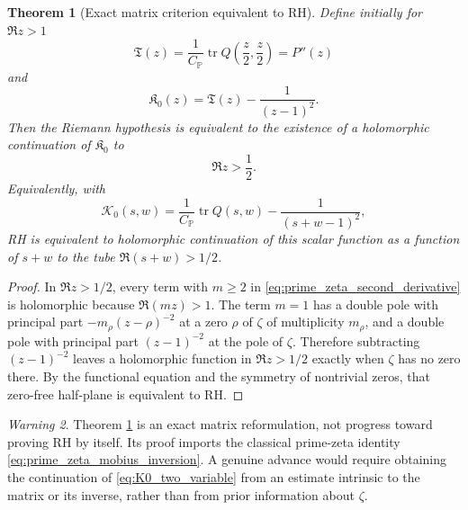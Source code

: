 \documentclass[11pt]{amsart}
\numberwithin{equation}{section}
\theoremstyle{plain}
\newtheorem{theorem}{Theorem}[section]
\theoremstyle{definition}
\theoremstyle{remark}
\newtheorem{warning}[theorem]{Warning}
\newcommand{\tr}{\operatorname{tr}}
\begin{document}
\begin{theorem}[Exact matrix criterion equivalent to RH]
\label{thm:matrix_RH_criterion}
Define initially for $\Re z>1$
\begin{equation}
\mathfrak T(z)=
\frac{1}{C_{\mathbb P}}
\tr Q\left(\frac z2,\frac z2\right)=P''(z)
\label{eq:T_prime_zeta}
\end{equation}
and
\begin{equation}
\mathfrak K_0(z)=\mathfrak T(z)-\frac{1}{(z-1)^2}.
\label{eq:K0_one_variable}
\end{equation}
Then the Riemann hypothesis is equivalent to the existence of a holomorphic continuation of $\mathfrak K_0$ to
\begin{equation}
\Re z>\frac12.
\label{eq:K0_target_half_plane}
\end{equation}
Equivalently, with
\begin{equation}
\mathcal K_0(s,w)=
\frac{1}{C_{\mathbb P}}\tr Q(s,w)
-\frac{1}{(s+w-1)^2},
\label{eq:K0_two_variable}
\end{equation}
RH is equivalent to holomorphic continuation of this scalar function as a function of $s+w$ to the tube $\Re(s+w)>1/2$.
\end{theorem}

\begin{proof}
In $\Re z>1/2$, every term with $m\ge2$ in \eqref{eq:prime_zeta_second_derivative} is holomorphic because $\Re(mz)>1$.  The term $m=1$ has a double pole with principal part $-m_\rho(z-\rho)^{-2}$ at a zero $\rho$ of $\zeta$ of multiplicity $m_\rho$, and a double pole with principal part $(z-1)^{-2}$ at the pole of $\zeta$.  Therefore subtracting $(z-1)^{-2}$ leaves a holomorphic function in $\Re z>1/2$ exactly when $\zeta$ has no zero there.  By the functional equation and the symmetry of nontrivial zeros, that zero-free half-plane is equivalent to RH.
\end{proof}

\begin{warning}
\label{warn:prime_zeta_criterion_reformulation}
Theorem \ref{thm:matrix_RH_criterion} is an exact matrix reformulation, not progress toward proving RH by itself.  Its proof imports the classical prime-zeta identity \eqref{eq:prime_zeta_mobius_inversion}.  A genuine advance would require obtaining the continuation of \eqref{eq:K0_two_variable} from an estimate intrinsic to the matrix or its inverse, rather than from prior information about $\zeta$.
\end{warning}
\end{document}
